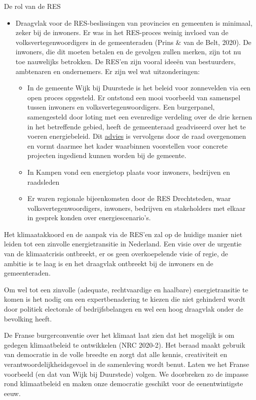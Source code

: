 \begin{voorstel}{De rol van de RES}
\begin{overwegingen}
\begin{itemize}
	\item Draagvlak voor de RES-beslissingen van provincies en gemeenten is minimaal, zeker bij de inwoners. Er was in het RES-proces weinig invloed van de volksvertegenwoordigers in de gemeenteraden (Prins \& van de Belt, 2020). De inwoners, die dit moeten betalen en de gevolgen zullen merken, zijn tot nu toe nauwelijks betrokken. De RES’en zijn vooral ideeën van bestuurders, ambtenaren en ondernemers. Er zijn wel wat uitzonderingen:
	\begin{itemize}
		\item In de gemeente Wijk bij Duurstede is het beleid voor zonnevelden via een open proces opgesteld. Er ontstond een mooi voorbeeld van samenspel tussen inwoners en volksvertegenwoordigers. Een burgerpanel, samengesteld door loting met een evenredige verdeling over de drie kernen in het betreffende gebied, heeft de gemeenteraad geadviseerd over het te voeren energiebeleid. Dit \href{https://zonneveldenwijkbijduurstede.nl/wp-content/uploads/2019/11/20190613-Advies-Burgerpanel-zonnevelden.pdf}{advies} is vervolgens door de raad overgenomen en vormt daarmee het kader waarbinnen voorstellen voor concrete projecten ingediend kunnen worden bij de gemeente.
		\item In Kampen vond een energietop plaats voor inwoners, bedrijven en raadsleden
		\item Er waren regionale bijeenkomsten door de RES Drechtsteden, waar volksvertegenwoordigers, inwoners, bedrijven en stakeholders met elkaar in gesprek konden over energiescenario’s.
	\end{itemize}
\end{itemize}

Het klimaatakkoord en de aanpak via de RES’en zal op de huidige manier niet leiden tot een zinvolle energietransitie in Nederland. Een visie over de urgentie van de klimaatcrisis ontbreekt, er os geen overkoepelende visie of regie, de ambitie is te laag is en het draagvlak ontbreekt bij de inwoners en de gemeenteraden.

Om wel tot een zinvolle (adequate, rechtvaardige en haalbare) energietransitie te komen is het nodig om een expertbenadering te kiezen die niet gehinderd wordt door politiek electorale of bedrijfsbelangen en wel een hoog draagvlak onder de bevolking heeft.

De Franse burgerconventie over het klimaat laat zien dat het mogelijk is om gedegen klimaatbeleid te ontwikkelen (NRC 2020-2). Het beraad maakt gebruik van democratie in de volle breedte en zorgt dat alle kennis, creativiteit en verantwoordelijkheidsgevoel in de samenleving wordt benut. Laten we het Franse voorbeeld (en dat van Wijk bij Duurstede) volgen. We doorbreken zo de impasse rond klimaatbeleid en maken onze democratie geschikt voor de eenentwintigste eeuw.
\end{overwegingen}


\end{voorstel}
